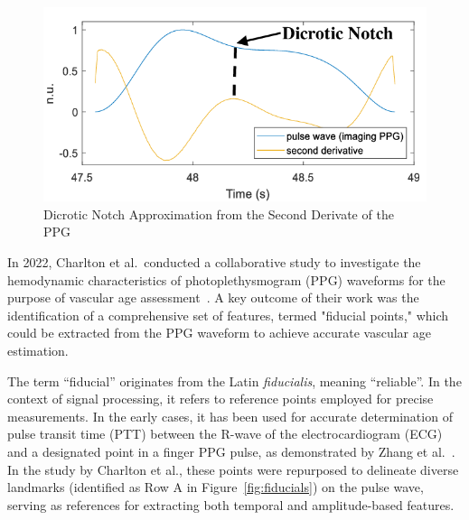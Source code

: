 \begin{figure}[h]
    \centering
    \includegraphics[scale=0.6]{images/sp/dic_notch}
    \caption{Dicrotic Notch Approximation from the Second Derivate of the PPG~\cite{djeldjliImagingPhotoplethysmographySignal2019}}
    \label{fig:dic_notch}
\end{figure}

In 2022, Charlton et al.\ conducted a collaborative study to investigate the hemodynamic characteristics of photoplethysmogram (PPG) waveforms for the purpose of vascular age assessment~\cite{charltonAssessingHemodynamicsPhotoplethysmogram2022}. A key outcome of their work was the identification of a comprehensive set of features, termed "fiducial points," which could be extracted from the PPG waveform to achieve accurate vascular age estimation.

The term \enquote{fiducial} originates from the Latin \textit{fiducialis}, meaning \enquote{reliable}.
In the context of signal processing, it refers to reference points employed for precise measurements.
In the early cases, it has been used for accurate determination of pulse transit time (PTT) between the R-wave of the electrocardiogram (ECG) and a designated point in a finger PPG pulse, as demonstrated by Zhang et al.~\cite{zhangEffectLocalCold2005}.
In the study by Charlton et al., these points were repurposed to delineate diverse landmarks (identified as Row A in Figure~\ref{fig:fiducials}) on the pulse wave, serving as references for extracting both temporal and amplitude-based features.

